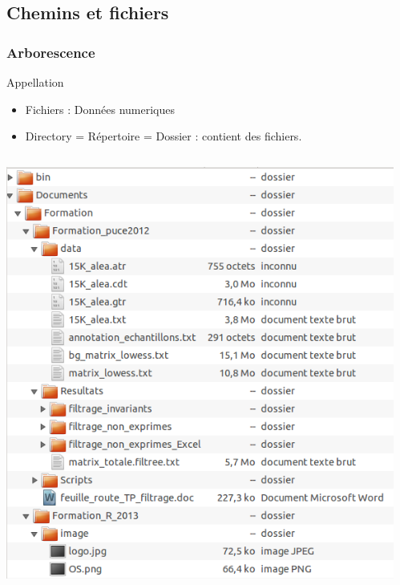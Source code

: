 \documentclass[table,svgnames,hyperref={pdfpagemode=FullScreen}]{beamer}
\begin{document}
\subsection{Chemins et fichiers}
\begin{frame}
	\frametitle{Arborescence}
	\begin{block}{Appellation}
		\begin{itemize}
			\item Fichiers : Données numeriques
			\item Directory = Répertoire = Dossier : contient des fichiers.
		\end{itemize}
	\end{block}
	\begin{columns}
		\begin{column}[c]{5cm}
			\includegraphics[scale=0.25]{image/ArboUbuntu.png}
		\end{column}
			\begin{column}[c]{5cm}

\end{column}
\end{columns}
\end{frame}
\end{document}
